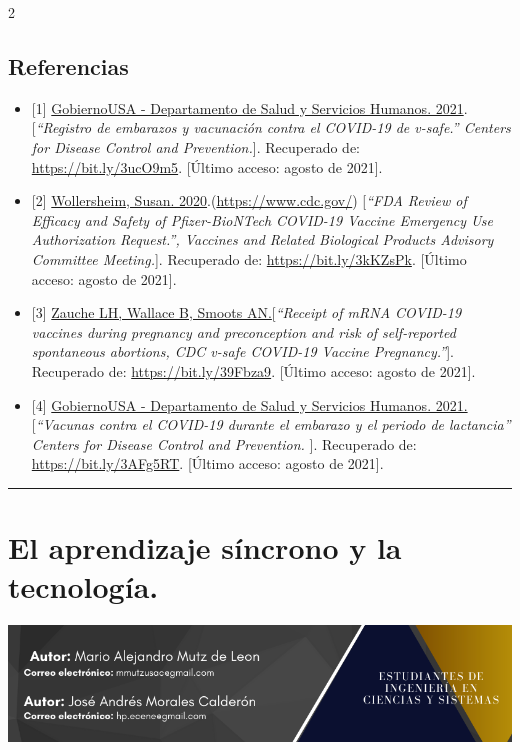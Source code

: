\documentclass[12pt,spanish,Letterpaper,openany]{book}
\newcommand{\HRule}{\begin{center}\rule{0.5\linewidth}{0.2mm}\end{center}}
\begin{document}
\begin {multicols}{2}
\hypertarget{referencias-8}{%
\section{Referencias}\label{referencias-8}}

\begin{itemize}
\item
  {[}1{]} \href{https://www.cdc.gov/}{GobiernoUSA - Departamento de Salud y Servicios Humanos. 2021}.
  {[}\emph{``Registro de embarazos y vacunación contra el COVID-19 de v-safe.'' Centers for Disease Control and Prevention.}{]}. Recuperado de: \url{https://bit.ly/3ucO9m5}. {[}Último acceso: agosto de 2021{]}.
\item
  {[}2{]} \href{https://portal.ingenieria.usac.edu.gt/}{Wollersheim, Susan. 2020}.(\url{https://www.cdc.gov/}) {[}\emph{``FDA Review of Efficacy and Safety of Pfizer-BioNTech COVID-19 Vaccine Emergency Use Authorization Request.'', Vaccines and Related Biological Products Advisory Committee Meeting.}{]}. Recuperado de: \url{https://bit.ly/3kKZsPk}. {[}Último acceso: agosto de 2021{]}.
\item
  {[}3{]} \href{https://www.researchsquare.com/}{Zauche LH, Wallace B, Smoots AN.}{[}\emph{``Receipt of mRNA COVID-19 vaccines during pregnancy and preconception and risk of self-reported spontaneous abortions, CDC v-safe COVID-19 Vaccine Pregnancy.''}{]}. Recuperado de: \url{https://bit.ly/39Fbza9}. {[}Último acceso: agosto de 2021{]}.
\item
  {[}4{]} \href{https://espanol.cdc.gov/}{GobiernoUSA - Departamento de Salud y Servicios Humanos. 2021.}{[}\emph{``Vacunas contra el COVID-19 durante el embarazo y el periodo de lactancia'' Centers for Disease Control and Prevention. }{]}. Recuperado de: \url{https://bit.ly/3AFg5RT}. {[}Último acceso: agosto de 2021{]}.
\end{itemize}

\end {multicols}

\medskip

\HRule

\medskip

\hypertarget{pareja34}{%
\chapter{El aprendizaje síncrono y la tecnología.}\label{pareja34}}

\begin{center}\includegraphics[width=1\linewidth]{images/pareja34_01} \end{center}
\end{document}
